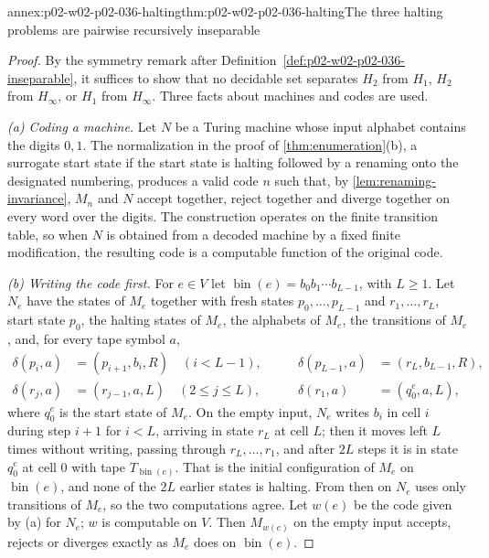 \begin{annexitem}{annex:p02-w02-p02-036-halting}{thm:p02-w02-p02-036-halting}{The three halting problems are pairwise recursively inseparable}
\begin{proof}
By the symmetry remark after
Definition~\ref{def:p02-w02-p02-036-inseparable}, it suffices to show that
no decidable set separates \(H_2\) from \(H_1\), \(H_2\) from \(H_\infty\), or
\(H_1\) from \(H_\infty\).  Three facts about machines and codes are used.

\emph{(a) Coding a machine.}  Let \(N\) be a Turing machine whose input
alphabet contains the digits \(0,1\).  The normalization in the proof of
\cref{thm:enumeration}(b), a surrogate start state if the start state is
halting followed by a renaming onto the designated numbering, produces a valid
code \(n\) such that, by \cref{lem:renaming-invariance}, \(M_n\) and \(N\)
accept together, reject together and diverge together on every word over the
digits.  The construction operates on the finite transition table, so when
\(N\) is obtained from a decoded machine by a fixed finite modification, the
resulting code is a computable function of the original code.

\emph{(b) Writing the code first.}  For \(e\in V\) let
\(\operatorname{bin}(e)=b_0b_1\cdots b_{L-1}\), with \(L\geq1\).  Let \(N_e\) have
the states of \(M_e\) together with fresh states \(p_0,\ldots,p_{L-1}\) and
\(r_1,\ldots,r_L\), start state \(p_0\), the halting states of \(M_e\), the
alphabets of \(M_e\), the transitions of \(M_e\), and, for every tape symbol
\(a\),
\[
\begin{aligned}
 \delta(p_i,a)&=(p_{i+1},b_i,R)\quad(i<L-1),&\qquad
 \delta(p_{L-1},a)&=(r_L,b_{L-1},R),\\
 \delta(r_j,a)&=(r_{j-1},a,L)\quad(2\leq j\leq L),&\qquad
 \delta(r_1,a)&=(q_0^{e},a,L),
\end{aligned}
\]
where \(q_0^{e}\) is the start state of \(M_e\).  On the empty input, \(N_e\)
writes \(b_i\) in cell \(i\) during step \(i+1\) for \(i<L\), arriving in state
\(r_L\) at cell \(L\); then it moves left \(L\) times without writing, passing
through \(r_L,\ldots,r_1\), and after \(2L\) steps it is in state \(q_0^{e}\) at
cell \(0\) with tape \(T_{\operatorname{bin}(e)}\).  That is the initial
configuration of \(M_e\) on \(\operatorname{bin}(e)\), and none of the \(2L\)
earlier states is halting.  From then on \(N_e\) uses only transitions of
\(M_e\), so the two computations agree.  Let \(w(e)\) be the code given by (a)
for \(N_e\); \(w\) is computable on \(V\).  Then \(M_{w(e)}\) on the empty input
accepts, rejects or diverges exactly as \(M_e\) does on \(\operatorname{bin}(e)\).


\end{proof}
\end{annexitem}
